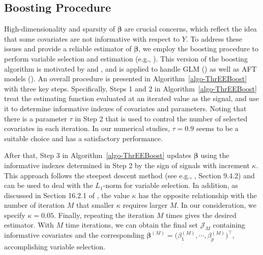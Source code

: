 \subsection{Boosting Procedure} \label{Boost_VSE}

High-dimensionality and sparsity of $\boldsymbol{\beta}$ are crucial concerns, which reflect {the idea} that some covariates are not informative with respect to $Y$.  To address these issues and provide {a reliable} estimator of $\boldsymbol{\beta}$, we employ the boosting procedure to perform variable selection and estimation (e.g., \citealp{Hastie:2008}). {This version of the boosting algorithm} is motivated by \cite{Wolfson:2011} and \cite{Brown:2017}, and is applied to handle GLM (\citealp{Chen:2023}) as well as AFT models (\citealp{ChenQiu:2023}). An overall procedure is presented in Algorithm~\ref{algo-ThrEEBoost} with three key steps. Specifically, Steps 1 and 2 in Algorithm~\ref{algo-ThrEEBoost} treat the estimating function evaluated at  an iterated value as the signal, and use it to determine informative indexes of covariates and parameters. Noting that there is a parameter $\tau$ in Step {2} that is used to control the number of selected covariates in each iteration. In our numerical studies, $\tau=0.9$ seems to be a suitable choice and has a satisfactory performance.


After that, Step 3 in Algorithm~\ref{algo-ThrEEBoost} updates $\boldsymbol{\beta}$ {using the} informative indexes determined in {Step 2} by the sign of signals with increment $\kappa$. {This approach follows the steepest descent method (see e.g., \citealp{Boyd:2004}, Section 9.4.2) and can be used to deal with the $L_1$-norm for variable selection.} In addition, as discussed in Section 16.2.1 of \cite{Hastie:2008}, the value $\kappa$ has the opposite relationship with the number of iteration $M$ that smaller $\kappa$ requires larger $M$. In our consideration, we specify $\kappa = 0.05$. Finally, repeating the iteration $M$ times gives the desired estimator. With $M$ time iterations, we can obtain the final set $\mathcal{J}_M$ containing informative covariates and the corresponding $\boldsymbol{\beta}^{(M)} = \big( \beta_1^{(M)}, \cdots, \beta_p^{(M)}  \big)^\top$, {accomplishing} variable selection. 




